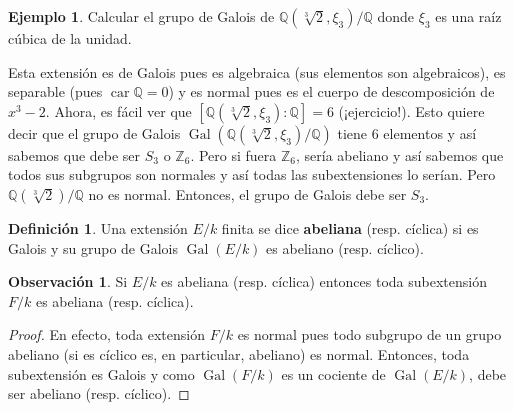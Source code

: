 \documentclass[12pt]{book}
\theoremstyle{definition}
\newtheorem{obs}[teo]{Observación}
\newtheorem{defn}[teo]{Definición}
\newtheorem{ex}[teo]{Ejemplo}
\newcommand{\ZZ}{\mathbb{Z}}      %
\newcommand{\QQ}{\mathbb{Q}}
\DeclareMathOperator{\car}{car}
\DeclareMathOperator{\Gal}{Gal}
\begin{document}
\begin{ex}
Calcular el grupo de Galois de $\QQ(\sqrt[3]{2},\xi_3)/\QQ$ donde $\xi_3$ es una raíz cúbica de la unidad.

Esta extensión es de Galois pues es algebraica (sus elementos son algebraicos), es separable (pues $\car \QQ=0$) y es normal pues es el cuerpo de descomposición de $x^3 - 2$. Ahora, es fácil ver que $[\QQ(\sqrt[3]{2},\xi_3):\QQ]=6$ (¡ejercicio!). Esto quiere decir que el grupo de Galois $\Gal(\QQ(\sqrt[3]{2},\xi_3)/\QQ)$ tiene $6$ elementos y así sabemos que debe ser $S_3$ o $\ZZ_6$. Pero si fuera $\ZZ_6$, sería abeliano y así sabemos que todos sus subgrupos son normales y así todas las subextensiones lo serían. Pero $\QQ(\sqrt[3]{2})/\QQ$ no es normal. Entonces, el grupo de Galois debe ser $S_3$.
\end{ex}

\begin{defn}
Una extensión $E/k$ finita se dice \textbf{abeliana} (resp. cíclica) si es Galois y su grupo de Galois $\Gal(E/k)$ es abeliano (resp. cíclico).
\end{defn}

\begin{obs}
Si $E/k$ es abeliana (resp. cíclica) entonces toda subextensión $F/k$ es abeliana (resp. cíclica).
\begin{proof}
En efecto, toda extensión $F/k$ es normal pues todo subgrupo de un grupo abeliano (si es cíclico es, en particular, abeliano) es normal. Entonces, toda subextensión es Galois y como $\Gal(F/k)$ es un cociente de $\Gal(E/k)$, debe ser abeliano (resp. cíclico).
\end{proof}
\end{obs}
\end{document}
